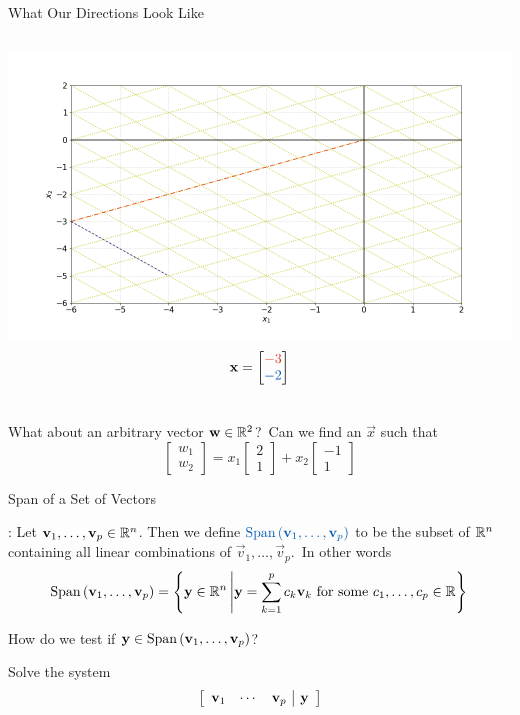 \documentclass[xcoler=dvipsnames, aspectratio=169]{beamer}
\begin{document}
    \begin{frame}{What Our Directions Look Like}
        \begin{columns}
            \includegraphics[width=.8\textwidth]{images/fig-span3.png}
            \[
                \vec{x} = \begin{bmatrix}
                    \rText{-3}\\\bText{-2}
                \end{bmatrix}
            \]
        \end{columns}
        \pause
        What about an arbitrary vector $\vec{w}\in\R^2$?\pause\  Can we find an $\vec{x}$ such that
        \[
            \begin{bmatrix}
                w_1\\w_2
            \end{bmatrix} = x_1\begin{bmatrix}
                2\\1
            \end{bmatrix} + x_2\begin{bmatrix}
                -1\\1
            \end{bmatrix}
        \]

    \end{frame}
    \begin{frame}{Span of a Set of Vectors}
        \begin{defn}
            : Let $\vec{v}_1,\dots,\vec{v}_p\in\R^n$. 
            Then we define $\bText{\Span{\vec{v}_1,\dots,\vec{v}_p}}$ 
            to be the subset of $\R^n$ containing all linear combinations 
            of $\vec{v}_1,\dots,\vec{v}_p$.\pause\ In other words
            \[
                \Span{\vec{v}_1,\dots,\vec{v}_p} = \set{\vec{y}\in\R^n}
                {\vec{y} = \sum_{k=1}^pc_k\vec{v}_k\text{ for some }
                c_1,\dots,c_p\in\R}
            \]
        \end{defn}
        \pause
        How do we test if $\vec{y}\in\Span{\vec{v}_1,\dots,\vec{v}_p}$?
        \pause
        \begin{solution}
            Solve the system \[
                \aMat{ccc|c}{
                    \vec{v}_1 & \cdots & \vec{v}_p & \vec{y}
                }
            \]
        \end{solution}
    \end{frame}
\end{document}
